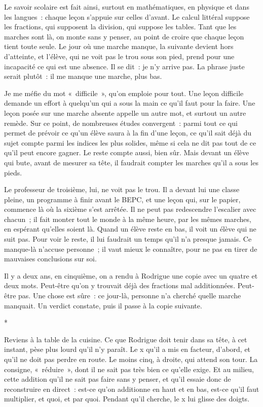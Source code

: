 \documentclass[10.5pt,twoside,openright]{book}
\newcommand{\asterisme}{\par\vspace{0.7em}\centerline{\color{gris}*\quad*\quad*}\vspace{0.7em}\par\noindent}
\begin{document}
Le savoir scolaire est fait ainsi, surtout en mathématiques, en physique et dans les langues : chaque leçon s’appuie sur celles d’avant. Le calcul littéral suppose les fractions, qui supposent la division, qui suppose les tables. Tant que les marches sont là, on monte sans y penser, au point de croire que chaque leçon tient toute seule. Le jour où une marche manque, la suivante devient hors d’atteinte, et l’élève, qui ne voit pas le trou sous son pied, prend pour une incapacité ce qui est une absence. Il se dit : je n’y arrive pas. La phrase juste serait plutôt : il me manque une marche, plus bas.

Je me méfie du mot « difficile », qu’on emploie pour tout. Une leçon difficile demande un effort à quelqu’un qui a sous la main ce qu’il faut pour la faire. Une leçon posée sur une marche absente appelle un autre mot, et surtout un autre remède. Sur ce point, de nombreuses études convergent : parmi tout ce qui permet de prévoir ce qu’un élève saura à la fin d’une leçon, ce qu’il sait déjà du sujet compte parmi les indices les plus solides, même si cela ne dit pas tout de ce qu’il peut encore gagner. Le reste compte aussi, bien sûr. Mais devant un élève qui bute, avant de mesurer sa tête, il faudrait compter les marches qu’il a sous les pieds.

Le professeur de troisième, lui, ne voit pas le trou. Il a devant lui une classe pleine, un programme à finir avant le BEPC, et une leçon qui, sur le papier, commence là où la sixième s’est arrêtée. Il ne peut pas redescendre l’escalier avec chacun ; il fait monter tout le monde à la même heure, par les mêmes marches, en espérant qu’elles soient là. Quand un élève reste en bas, il voit un élève qui ne suit pas. Pour voir le reste, il lui faudrait un temps qu’il n’a presque jamais. Ce manque-là n’accuse personne ; il vaut mieux le connaître, pour ne pas en tirer de mauvaises conclusions sur soi.

Il y a deux ans, en cinquième, on a rendu à Rodrigue une copie avec un quatre et deux mots. Peut-être qu’on y trouvait déjà des fractions mal additionnées. Peut-être pas. Une chose est sûre : ce jour-là, personne n’a cherché quelle marche manquait. Un verdict constate, puis il passe à la copie suivante.

\asterisme

Reviens à la table de la cuisine. Ce que Rodrigue doit tenir dans sa tête, à cet instant, pèse plus lourd qu’il n’y paraît. Le x qu’il a mis en facteur, d’abord, et qu’il ne doit pas perdre en route. Le moins cinq, à droite, qui attend son tour. La consigne, « réduire », dont il ne sait pas très bien ce qu’elle exige. Et au milieu, cette addition qu’il ne sait pas faire sans y penser, et qu’il essaie donc de reconstruire en direct : est-ce qu’on additionne en haut et en bas, est-ce qu’il faut multiplier, et quoi, et par quoi. Pendant qu’il cherche, le x lui glisse des doigts.
\end{document}
